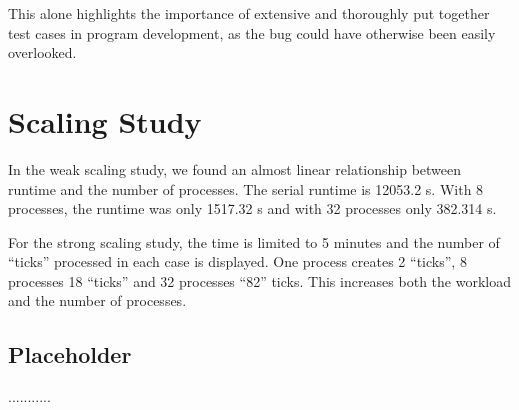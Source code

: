 \documentclass[11pt]{article}
\begin{document}
This alone highlights the importance of extensive and thoroughly put together test cases in program development, as the bug could have otherwise been easily overlooked.

\section{Scaling Study}
In the weak scaling study, we found an almost linear relationship between runtime and the number of processes. The serial runtime is 12053.2 s. With 8 processes, the runtime was only 1517.32 s and with 32 processes only 382.314 s.

For the strong scaling study, the time is limited to 5 minutes and the number of “ticks” processed in each case is displayed. One process creates 2 “ticks”, 8 processes 18 “ticks” and 32 processes “82” ticks. This increases both the workload and the number of processes. 

\subsection{Placeholder}
...........
\end{document}
